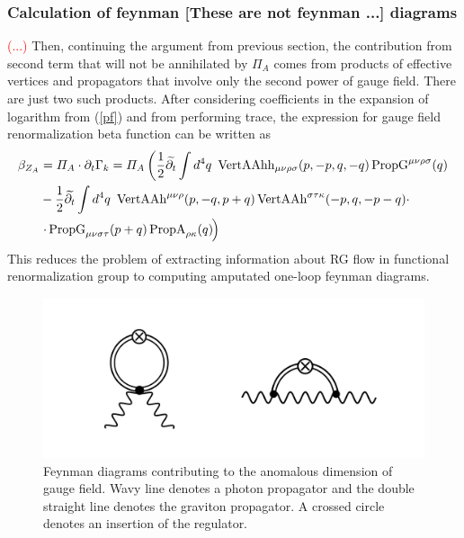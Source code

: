 \documentclass[11pt, a4paper]{article}
\newcommand{\jhkbf}[1]{\textbf{\color{red} [#1]}}
\begin{document}
\subsubsection{Calculation of feynman \jhkbf{These are not feynman ...} diagrams}
\textcolor{red}{(...)} Then, continuing the argument from previous section, the contribution from second term that will not be annihilated
by $\varPi_A$ comes from products of effective vertices and propagators that involve only the second power of gauge field.
There are just two such products. After considering coefficients in the expansion of logarithm from (\ref{pf}) and from performing trace, the expression for gauge field renormalization beta function can be written as
\begin{align}
    \beta_{Z_A} & = \varPi_A \cdot \partial_t \Gamma_k = \varPi_A \left( \frac{1}{2} \widetilde{\partial_t} \int d^4 q \ \operatorname{VertAAhh}_{\mu\nu\rho\sigma}(p,-p,q,-q) \operatorname{PropG}^{\mu\nu\rho\sigma}(q)\right.\\
    & - \frac{1}{2} \widetilde{\partial_t} \int d^4 q \ \operatorname{VertAAh}^{\mu\nu\rho}(p,-q,p+q) \operatorname{VertAAh}^{\sigma\tau\kappa}(-p,q,-p-q) \cdot \\
    &\left. \cdot \operatorname{PropG}_{\mu\nu\sigma\tau}(p+q) \operatorname{PropA}_{\rho\kappa}(q) \phantom{\frac{}{}} \hspace{-0.35em}\right)
\end{align}
This reduces the problem of extracting information about RG flow in functional renormalization group to computing amputated one-loop feynman diagrams.
\begin{figure}[H]
    \includegraphics[width=1\textwidth]{./figures/diags.png}
    \caption{Feynman diagrams contributing to the anomalous dimension of gauge field. Wavy line denotes a photon propagator
    and the double straight line denotes the graviton propagator. A crossed circle denotes an insertion of the regulator.}
    \label{diags}
\end{figure} 
\end{document}
